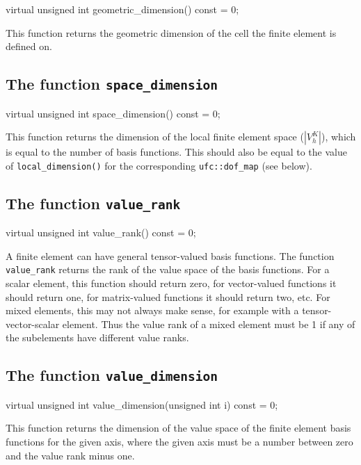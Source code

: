 \begin{code}
virtual unsigned int geometric_dimension() const = 0;
\end{code}

This function returns the geometric dimension of the cell the finite
element is defined on.

\subsection{The function \texttt{space\_dimension}}

\begin{code}
virtual unsigned int space_dimension() const = 0;
\end{code}

This function returns the dimension of the local finite element space
($|V_h^K|$), which is equal to the number of basis functions. This
should also be equal to the value of \texttt{local\_dimension()} for
the corresponding \texttt{ufc::dof\_map} (see below).

\subsection{The function \texttt{value\_rank}}

\begin{code}
virtual unsigned int value_rank() const = 0;
\end{code}

A finite element can have general tensor-valued basis functions.  The
function \texttt{value\_rank} returns the rank of the value space of
the basis functions. For a scalar element, this function should return
zero, for vector-valued functions it should return one, for
matrix-valued functions it should return two, etc. For mixed elements, this
may not always make sense, for example with a tensor-vector-scalar element.
Thus the value rank of a mixed element must be 1 if any of the subelements have
different value ranks.

\subsection{The function \texttt{value\_dimension}}

\begin{code}
virtual unsigned int
value_dimension(unsigned int i) const = 0;
\end{code}

This function returns the dimension of the value space of the finite
element basis functions for the given axis, where the given axis must
be a number between zero and the value rank minus one.

